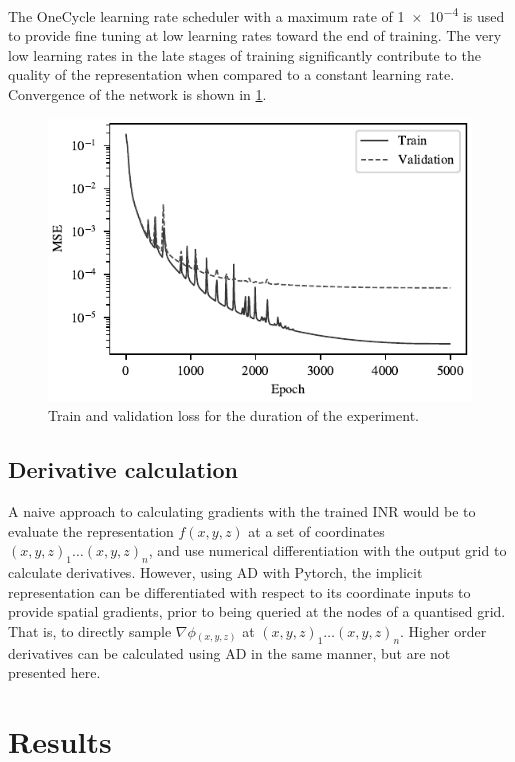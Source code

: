 \documentclass[manuscript.tex]{subfiles}
\begin{document}
The OneCycle learning rate scheduler \parencite{smithSuperconvergenceVeryFast2018} with a maximum rate of \num{1e-4} is used to provide fine tuning at low learning rates toward the end of training.
The very low learning rates in the late stages of training significantly contribute to the quality of the representation when compared to a constant learning rate.
Convergence of the network is shown in \cref{fig:convergence}.


\begin{figure}[hbt]
    \centering{}
    \includegraphics[width=0.5\linewidth]{fig/p3/loss_plot.pdf}
    \caption[Training convergence]{Train and validation loss for the duration of the experiment.}
    \label{fig:convergence}
\end{figure}

\subsection{Derivative calculation}
A naive approach to calculating gradients with the trained INR would be to evaluate the representation \(f(x, y, z)\) at a set of coordinates \({(x, y, z)}_1 \dots {(x,y,z)}_n\), and use numerical differentiation with the output grid to calculate derivatives.
However, using AD with Pytorch, the implicit representation can be differentiated with respect to its coordinate inputs to provide spatial gradients, prior to being queried at the nodes of a quantised grid.
That is, to directly sample \(\nabla{}\phi{}_{(x,y,z)}\) at \({(x, y, z)}_1 \dots {(x,y,z)}_n\).
Higher order derivatives can be calculated using AD in the same manner, but are not presented here.

\section{Results}
\end{document}
